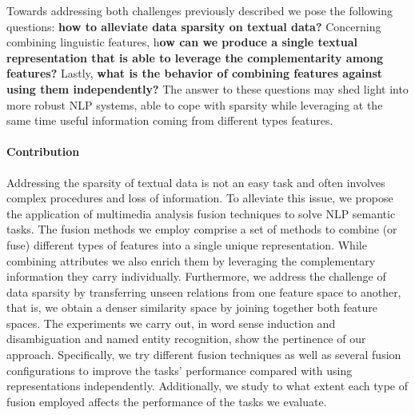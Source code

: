 Towards addressing both challenges previously described we pose the following questions: \textbf{how to alleviate data sparsity on textual data?}  Concerning combining linguistic features, h\textbf{ow can we produce a single textual representation  that is able to leverage the complementarity among features?} Lastly, \textbf{what is the behavior of combining features against using them independently?} The answer to these questions may shed light into more robust NLP systems, able to cope with sparsity while leveraging at the same time useful information coming from different types features.





\paragraph{Contribution}












Addressing the sparsity of textual data is not an easy task and often involves complex procedures and loss of information. To alleviate this issue, we propose the application of multimedia analysis fusion techniques to solve NLP semantic tasks. The fusion methods we employ comprise a set of methods to combine (or fuse) different types of features into a single unique representation. While combining attributes we also enrich them by leveraging the complementary information  they carry individually. Furthermore, we address the challenge of data sparsity by transferring unseen relations from one feature space to another, that is, we obtain a denser similarity space by joining together both feature spaces. The experiments we carry out, in word sense induction and disambiguation and named entity recognition, show the pertinence of our approach. Specifically, we try different fusion techniques as well as several fusion configurations to improve the tasks' performance compared with using representations independently. Additionally, we study to what extent each type of fusion employed affects the performance of the tasks we evaluate.



